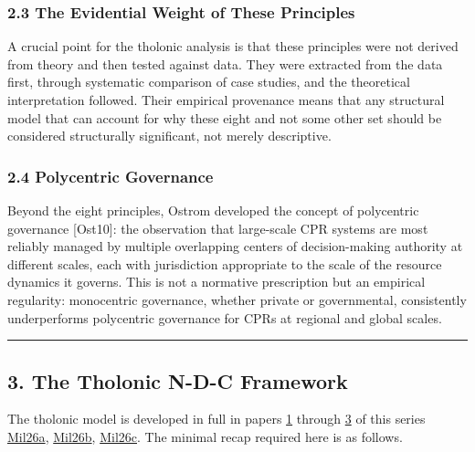\documentclass[
  11pt,
  letterpaper,
]{article}
\begin{document}
\subsubsection{2.3 The Evidential Weight of These
Principles}\label{the-evidential-weight-of-these-principles}

A crucial point for the tholonic analysis is that these principles were
not derived from theory and then tested against data. They were
extracted from the data first, through systematic comparison of case
studies, and the theoretical interpretation followed. Their empirical
provenance means that any structural model that can account for why
these eight and not some other set should be considered structurally
significant, not merely descriptive.

\subsubsection{2.4 Polycentric Governance}\label{polycentric-governance}

Beyond the eight principles, Ostrom developed the concept of polycentric
governance {[}Ost10{]}: the observation that large-scale CPR systems are
most reliably managed by multiple overlapping centers of decision-making
authority at different scales, each with jurisdiction appropriate to the
scale of the resource dynamics it governs. This is not a normative
prescription but an empirical regularity: monocentric governance,
whether private or governmental, consistently underperforms polycentric
governance for CPRs at regional and global scales.

\begin{center}\rule{0.5\linewidth}{0.5pt}\end{center}

\subsection{3. The Tholonic N-D-C
Framework}\label{the-tholonic-n-d-c-framework}

The tholonic model is developed in full in papers
\href{https://github.com/baardev/truevalue/blob/main/docnav/Research/papers/1_recursive-tholonic-five-constants/1_recursive-tholonic-five-constants.pdf}{1}
through
\href{https://github.com/baardev/truevalue/blob/main/docnav/Research/papers/3_minimal-recursive-triadic-framework/3_minimal-recursive-triadic-framework.pdf}{3}
of this series
\href{https://github.com/baardev/truevalue/blob/main/docnav/Research/papers/1_recursive-tholonic-five-constants/1_recursive-tholonic-five-constants.pdf}{Mil26a},
\href{https://github.com/baardev/truevalue/blob/main/docnav/Research/papers/2_supply-chain-transparency-tvpci/2_supply-chain-transparency-tvpci.pdf}{Mil26b},
\href{https://github.com/baardev/truevalue/blob/main/docnav/Research/papers/3_minimal-recursive-triadic-framework/3_minimal-recursive-triadic-framework.pdf}{Mil26c}.
The minimal recap required here is as follows.
\end{document}
